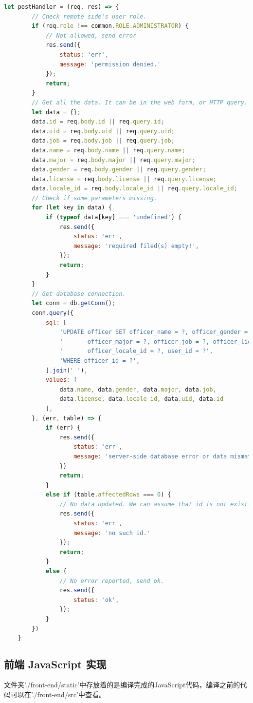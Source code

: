 \documentclass[a4paper, 12pt]{article}
\begin{document}
	\begin{lstlisting}[language=javascript, basicstyle=\small\lstfont, showstringspaces=false]
	let postHandler = (req, res) => {
	    // Check remote side's user role.
	    if (req.role !== common.ROLE.ADMINISTRATOR) {
	        // Not allowed, send error
	        res.send({
	            status: 'err',
	            message: 'permission denied.'
	        });
	        return;
	    }
	    // Get all the data. It can be in the web form, or HTTP query.
	    let data = {};
	    data.id = req.body.id || req.query.id;
	    data.uid = req.body.uid || req.query.uid;
	    data.job = req.body.job || req.query.job;
	    data.name = req.body.name || req.query.name;
	    data.major = req.body.major || req.query.major;
	    data.gender = req.body.gender || req.query.gender;
	    data.license = req.body.license || req.query.license;
	    data.locale_id = req.body.locale_id || req.query.locale_id;
	    // Check if some parameters missing.	    
	    for (let key in data) {
	        if (typeof data[key] === 'undefined') {
	            res.send({
	                status: 'err',
	                message: 'required filed(s) empty!',
	            });
	            return;
	        }
	    }
	    // Get database connection.
	    let conn = db.getConn();
	    conn.query({
	        sql: [
	            'UPDATE officer SET officer_name = ?, officer_gender = ?,',
	            '       officer_major = ?, officer_job = ?, officer_license_id = ?,',
	            '       officer_locale_id = ?, user_id = ?',
	            'WHERE officer_id = ?',
	        ].join(' '),
	        values: [
	            data.name, data.gender, data.major, data.job,
	            data.license, data.locale_id, data.uid, data.id
	        ],
	    }, (err, table) => {
	        if (err) {
	            res.send({
	                status: 'err',
	                message: 'server-side database error or data mismatch.'
	            })
	            return;
	        }
	        else if (table.affectedRows === 0) {
	            // No data updated. We can assume that id is not exist.
	            res.send({
	                status: 'err',
	                message: 'no such id.'
	            });
	            return;
	        }
	        else {
	            // No error reported, send ok.
	            res.send({
	                status: 'ok',
	            });
	        }
	    })
	}
	\end{lstlisting}

	\subsection{\normalfont 前端 JavaScript 实现}
	文件夹{\inlinecode './front-end/static'}中存放着的是编译完成的JavaScript代码，编译之前的代码可以在{\inlinecode './front-end/src'}中查看。\\
\end{document}
